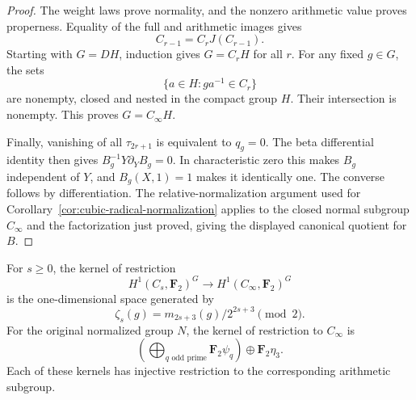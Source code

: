 \begin{proof}
The weight laws prove normality, and the nonzero arithmetic value
proves properness. Equality of the full and arithmetic images gives
\[
 C_{r-1}=C_rJ(C_{r-1}).
\]
Starting with $G=DH$, induction gives $G=C_rH$ for all $r$.
For any fixed $g\in G$, the sets
\[
 \{a\in H:ga^{-1}\in C_r\}
\]
are nonempty, closed and nested in the compact group $H$.
Their intersection is nonempty. This proves $G=C_\infty H$.

Finally, vanishing of all $\tau_{2r+1}$ is equivalent to $q_g=0$.
The beta differential identity then gives
$B_g^{-1}Y\partial_YB_g=0$. In characteristic zero this makes
$B_g$ independent of $Y$, and $B_g(X,1)=1$ makes it identically
one. The converse follows by differentiation.
The relative-normalization argument used for
Corollary~\ref{cor:cubic-radical-normalization} applies to the
closed normal subgroup $C_\infty$ and the factorization just
proved, giving the displayed canonical quotient for $B$.
\end{proof}

\begin{proposition}\label{prop:uniform-odd-character-kernels}
For $s\ge0$, the kernel of restriction
\[
 H^1(C_s,\mathbf F_2)^G\longrightarrow
 H^1(C_\infty,\mathbf F_2)^G
\]
is the one-dimensional space generated by
\[
 \zeta_s(g)=m_{2s+3}(g)/2^{2s+3}\pmod2.
\]
For the original normalized group $N$, the kernel of restriction
to $C_\infty$ is
\[
 \left(\bigoplus_{q\text{ odd prime}}\mathbf F_2\psi_q\right)
                     \oplus\mathbf F_2\eta_3.
\]
Each of these kernels has injective restriction to the corresponding
arithmetic subgroup.
\end{proposition}

